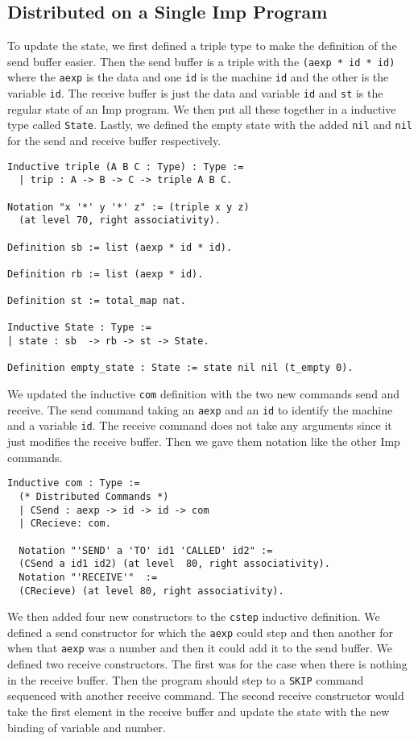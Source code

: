 \documentclass{llncs}
\begin{document}
\subsection{Distributed on a Single Imp Program}
To update the state, we first defined a triple type to make the definition of the send buffer easier. Then the send buffer is a triple with the \lstinline|(aexp * id * id)| where the \lstinline|aexp| is the data and one \lstinline|id| is the machine \lstinline|id| and the other is the variable \lstinline|id|. The receive buffer is just the data and variable \lstinline|id| and \lstinline|st| is the regular state of an Imp program. We then put all these together in a inductive type called \lstinline|State|. Lastly, we defined the empty state with the added \lstinline|nil| and \lstinline|nil| for the send and receive buffer respectively. 

\begin{lstlisting}
Inductive triple (A B C : Type) : Type :=
  | trip : A -> B -> C -> triple A B C.

Notation "x '*' y '*' z" := (triple x y z) 
  (at level 70, right associativity).

Definition sb := list (aexp * id * id).

Definition rb := list (aexp * id).

Definition st := total_map nat.

Inductive State : Type :=
| state : sb  -> rb -> st -> State.

Definition empty_state : State := state nil nil (t_empty 0).
\end{lstlisting}

We updated the inductive \lstinline|com| definition with the two new commands send and receive. The send command taking an \lstinline|aexp| and an \lstinline|id| to identify the machine and a variable \lstinline|id|. The receive command does not take any arguments since it just modifies the receive buffer. Then we gave them notation like the other Imp commands.

\begin{lstlisting}
Inductive com : Type :=
  (* Distributed Commands *)
  | CSend : aexp -> id -> id -> com
  | CRecieve: com.
  
  Notation "'SEND' a 'TO' id1 'CALLED' id2" :=
  (CSend a id1 id2) (at level  80, right associativity).
  Notation "'RECEIVE'"  :=
  (CRecieve) (at level 80, right associativity).
\end{lstlisting}

We then added four new constructors to the \lstinline|cstep| inductive definition. We defined a send constructor for which the \lstinline|aexp| could step and then another for when that \lstinline|aexp| was a number and then it could add it to the send buffer. We defined two receive constructors. The first was for the case when there is nothing in the receive buffer. Then the program should step to a \lstinline|SKIP| command sequenced with another receive command. The second receive constructor would take the first element in the receive buffer and update the state with the new binding of variable and number. 
\end{document}
